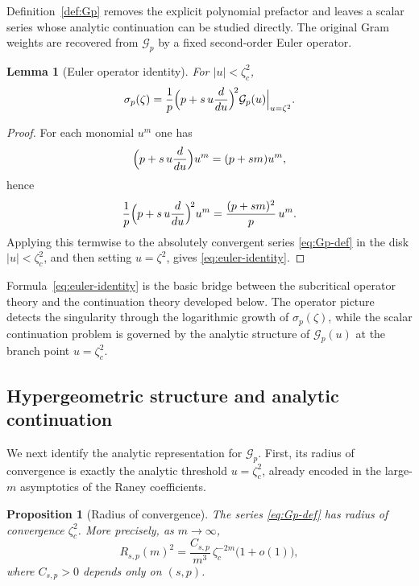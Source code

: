 \documentclass[11pt]{amsart}
\numberwithin{equation}{section}
\theoremstyle{plain}
\newtheorem{proposition}[theorem]{Proposition}
\newtheorem{lemma}[theorem]{Lemma}
\theoremstyle{definition}
\theoremstyle{remark}
\begin{document}
Definition~\ref{def:Gp} removes the explicit polynomial prefactor and leaves
a scalar series whose analytic continuation can be studied directly. The
original Gram weights are recovered from \(\mathcal G_p\) by a fixed
second-order Euler operator.

\begin{lemma}[Euler operator identity]
	\label{lem:euler-identity}
	For \(|u|<\zeta_c^2\),
	\begin{equation}\label{eq:euler-identity}
		\sigma_p(\zeta)
		=
		\frac1p\Bigl(p+s\,u\frac{d}{du}\Bigr)^{\!2}\mathcal G_p(u)
		\Big|_{u=\zeta^2}.
	\end{equation}
\end{lemma}

\begin{proof}
	For each monomial \(u^m\) one has
	\[
		\Bigl(p+s\,u\frac{d}{du}\Bigr)u^m=(p+sm)u^m,
	\]
	hence
	\[
		\frac1p\Bigl(p+s\,u\frac{d}{du}\Bigr)^{\!2}u^m
		=
		\frac{(p+sm)^2}{p}\,u^m.
	\]
	Applying this termwise to the absolutely convergent series
	\eqref{eq:Gp-def} in the disk \(|u|<\zeta_c^2\), and then setting
	\(u=\zeta^2\), gives \eqref{eq:euler-identity}.
\end{proof}

Formula~\eqref{eq:euler-identity} is the basic bridge between the
subcritical operator theory and the continuation theory developed below. The
operator picture detects the singularity through the logarithmic growth of
\(\sigma_p(\zeta)\), while the scalar continuation problem is governed by the
analytic structure of \(\mathcal G_p(u)\) at the branch point
\(u=\zeta_c^2\).


\subsection{Hypergeometric structure and analytic continuation}
\label{subsec:Gp-analytic}

We next identify the analytic representation for \(\mathcal G_p\). First, its radius of convergence is exactly the analytic threshold
\(u=\zeta_c^2\), already encoded in the large-\(m\) asymptotics of the Raney
coefficients.

\begin{proposition}[Radius of convergence]
	\label{prop:Gp-radius}
	The series \eqref{eq:Gp-def} has radius of convergence \(\zeta_c^2\). More
	precisely, as \(m\to\infty\),
	\begin{equation}\label{eq:Rsquared-asymp}
		R_{s,p}(m)^2
		=
		\frac{C_{s,p}}{m^3}\,\zeta_c^{-2m}\bigl(1+o(1)\bigr),
	\end{equation}
	where \(C_{s,p}>0\) depends only on \((s,p)\).
\end{proposition}
\end{document}
